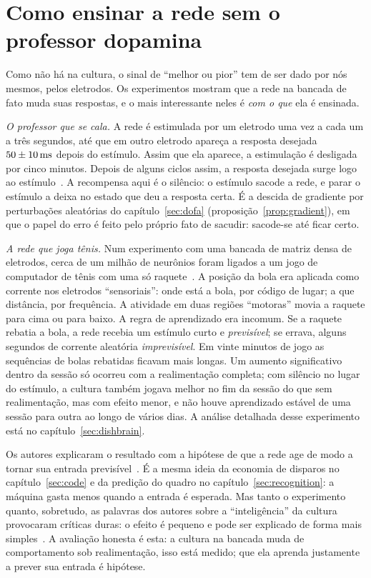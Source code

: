 \section{Como ensinar a rede sem o professor dopamina}

Como não há  na cultura, o sinal de ``melhor ou pior'' tem de ser dado por nós mesmos, pelos eletrodos. Os experimentos mostram que a rede na bancada de fato muda suas respostas, e o mais interessante neles é \emph{com o que} ela é ensinada.

\emph{O professor que se cala.} A rede é estimulada por um eletrodo uma vez a cada um a três segundos, até que em outro eletrodo apareça a resposta desejada $50\pm10\,\text{ms}$ depois do estímulo. Assim que ela aparece, a estimulação é desligada por cinco minutos. Depois de alguns ciclos assim, a resposta desejada surge logo ao estímulo~\cite{Shahaf2001}. A recompensa aqui é o silêncio: o estímulo sacode a rede, e parar o estímulo a deixa no estado que deu a resposta certa. É a descida de gradiente por perturbações aleatórias do capítulo~\ref{sec:dofa} (proposição~\ref{prop:gradient}), em que o papel do erro é feito pelo próprio fato de sacudir: sacode-se até ficar certo.

\emph{A rede que joga tênis.} Num experimento com uma bancada de matriz densa de eletrodos, cerca de um milhão de neurônios foram ligados a um jogo de computador de tênis com uma só raquete~\cite{Kagan2022}. A posição da bola era aplicada como corrente nos eletrodos ``sensoriais'': onde está a bola, por código de lugar; a que distância, por frequência. A atividade em duas regiões ``motoras'' movia a raquete para cima ou para baixo. A regra de aprendizado era incomum. Se a raquete rebatia a bola, a rede recebia um estímulo curto e \emph{previsível}; se errava, alguns segundos de corrente aleatória \emph{imprevisível}. Em vinte minutos de jogo as sequências de bolas rebatidas ficavam mais longas. Um aumento significativo dentro da sessão só ocorreu com a realimentação completa; com silêncio no lugar do estímulo, a cultura também jogava melhor no fim da sessão do que sem realimentação, mas com efeito menor, e não houve aprendizado estável de uma sessão para outra ao longo de vários dias. A análise detalhada desse experimento está no capítulo~\ref{sec:dishbrain}.

Os autores explicaram o resultado com a hipótese de que a rede age de modo a tornar sua entrada previsível~\cite{Friston2010}. É a mesma ideia da economia de disparos no capítulo~\ref{sec:code} e da predição do quadro no capítulo~\ref{sec:recognition}: a máquina gasta menos quando a entrada é esperada. Mas tanto o experimento quanto, sobretudo, as palavras dos autores sobre a ``inteligência'' da cultura provocaram críticas duras: o efeito é pequeno e pode ser explicado de forma mais simples~\cite{Balci2023}. A avaliação honesta é esta: a cultura na bancada muda de comportamento sob realimentação, isso está medido; que ela aprenda justamente a prever sua entrada é hipótese.

